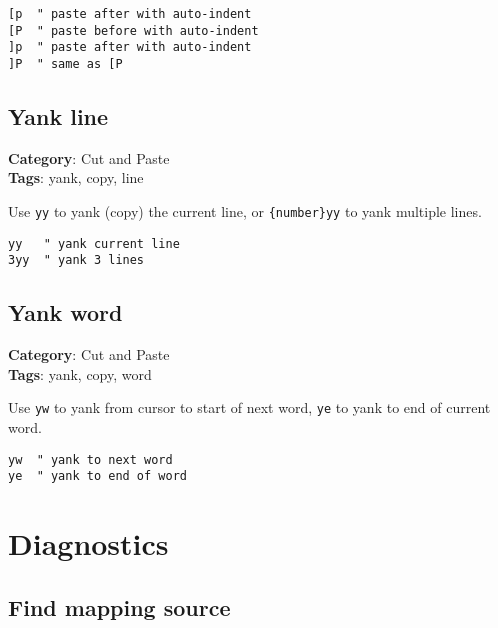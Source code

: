 {{{{\begin{Exa*}{}
\begin{Verbatim}[fontsize=\footnotesize, breaklines, breakanywhere]
[p  " paste after with auto-indent
[P  " paste before with auto-indent  
]p  " paste after with auto-indent
]P  " same as [P
\end{Verbatim}
\end{Exa*}

\section{Yank line}

\textbf{Category}: Cut and Paste\\ \textbf{Tags}: yank, copy, line
\vspace{0.5cm}

Use {\footnotesize \Verb§yy§} to yank (copy) the current line, or {\footnotesize \Verb§{number}yy§} to yank multiple lines.

\begin{Exa*}{}
\begin{Verbatim}[fontsize=\footnotesize, breaklines, breakanywhere]
yy   " yank current line
3yy  " yank 3 lines
\end{Verbatim}
\end{Exa*}

\section{Yank word}

\textbf{Category}: Cut and Paste\\ \textbf{Tags}: yank, copy, word
\vspace{0.5cm}

Use {\footnotesize \Verb§yw§} to yank from cursor to start of next word, {\footnotesize \Verb§ye§} to yank to end of current word.

\begin{Exa*}{}
\begin{Verbatim}[fontsize=\footnotesize, breaklines, breakanywhere]
yw  " yank to next word
ye  " yank to end of word
\end{Verbatim}
\end{Exa*}

\chapter{Diagnostics}
\section{Find mapping source}

}}}}
